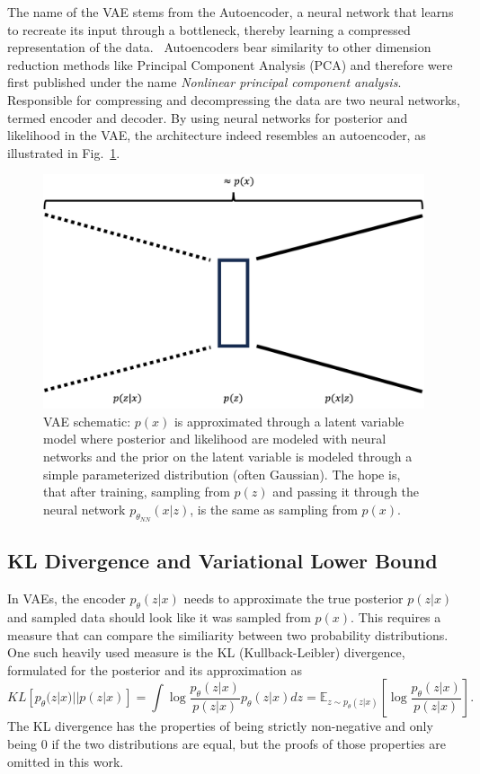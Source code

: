 The name of the VAE stems from the Autoencoder, a neural network that learns to recreate its input through a bottleneck, thereby learning a compressed representation of the data.~\autocite{https://doi.org/10.1002/aic.690370209} Autoencoders bear similarity to other dimension reduction methods like Principal Component Analysis (PCA) and therefore were first published under the name \textit{Nonlinear principal component analysis}. Responsible for compressing and decompressing the data are two neural networks, termed encoder and decoder. By using neural networks for posterior and likelihood in the VAE, the architecture indeed resembles an autoencoder, as illustrated in Fig.~\ref{fig:vae}.
\begin{figure}[h]
    \centering
    \includegraphics[width=.5\textwidth]{images/vae.png}
    \caption[VAE schematic]{VAE schematic: $p(x)$ is approximated through a latent variable model where posterior and likelihood are modeled with neural networks and the prior on the latent variable is modeled through a simple parameterized distribution (often Gaussian). The hope is, that after training, sampling from $p(z)$ and passing it through the neural network $p_{\theta_{NN}}(x|z)$, is the same as sampling from $p(x)$.}
    \label{fig:vae}
\end{figure}
\subsection{KL Divergence and Variational Lower Bound}
In VAEs, the encoder $p_{\theta}(z|x)$ needs to approximate the true posterior $p(z|x)$ and sampled data should look like it was sampled from $p(x)$. This requires a measure that can compare the similiarity between two probability distributions. One such heavily used measure is the KL (Kullback-Leibler) divergence, formulated for the posterior and its approximation as
\begin{equation}
    \label{eq:kldivergence}
    KL\left[p_{\theta}(z|x) || p(z|x)\right] = \int \log \frac{p_{\theta}(z|x)}{p(z|x)} p_{\theta}(z|x) dz = \mathbb{E}_{z\sim p_{\theta}(z|x)}\left[\log \frac{p_{\theta}(z|x)}{p(z|x)}\right].
\end{equation}
The KL divergence has the properties of being strictly non-negative and only being 0 if the two distributions are equal, but the proofs of those properties are omitted in this work.

